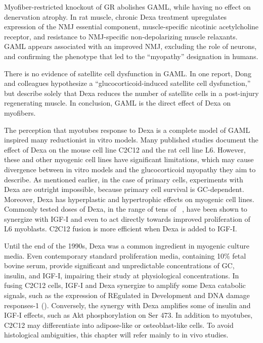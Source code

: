 \documentclass[12pt,english]{report}\usepackage[]{graphicx}\usepackage[]{color}
\begin{document}
Myofiber-restricted knockout of GR abolishes GAML, while having no
effect on denervation atrophy\citep{watson2012cell-autonomous}. In
rat muscle, chronic Dexa treatment upregulates expression of the NMJ
essential component, muscle-specific nicotinic acetylcholine receptor,
and resistance to NMJ-specific non-depolarizing muscle relaxants\citep{chen2014different}.
GAML appears associated with an improved NMJ, excluding the role of
neurons, and confirming the phenotype that led to the ``myopathy''
designation in humans.

There is no evidence of satellite cell dysfunction in GAML. In one
report, Dong and colleagues hypothesize a ``glucocorticoid-induced
satellite cell dysfunction,'' but describe solely that Dexa reduces
the number of satellite cells in a post-injury regenerating muscle\citep{dong2013myostatin}.
In conclusion, GAML is the direct effect of Dexa on myofibers. 

The perception that myotubes response to Dexa is a complete model
of GAML inspired many reductionist in vitro models. Many published
studies document the effect of Dexa on the mouse cell line C2C12 and
the rat cell line L6. However, these and other myogenic cell lines
have significant limitations, which may cause divergence between in
vitro models and the glucocorticoid myopathy they aim to describe.
As mentioned earlier, in the case of primary cells, experiments with
Dexa are outright impossible, because primary cell survival is GC-dependent.
Moreover, Dexa has hyperplastic and hypertrophic effects on myogenic
cell lines. Commonly tested doses of Dexa, in the range of tens of
\si{\nano\molar}, have been shown to synergize with IGF-I\citep{giorgino1995dexamethasone}
and even to act directly towards improved proliferation of L6 myoblasts\citep{florini1979serum-free,whitson1989dexamethasone}.
C2C12 fusion is more efficient when Dexa is added to IGF-I\citep{pansters2013synergistic}.

Until the end of the 1990s, Dexa was a common ingredient in myogenic
culture media\citep{takahashi2002myogenic}. Even contemporary standard
proliferation media, containing 10\% fetal bovine serum, provide significant
and unpredictable concentrations of GC, insulin, and IGF-I, impairing
their study at physiological concentrations. In fusing C2C12 cells,
IGF-I and Dexa synergize to amplify some Dexa catabolic signals, such
as the expression of REgulated in Development and DNA damage responses-1
()\citep{pansters2013synergistic}.
Conversely, the synergy with Dexa amplifies some of insulin and IGF-I
effects, such as Akt phosphorylation on Ser 473\citep{takahashi2002myogenic}.
In addition to myotubes, C2C12 may differentiate into adipose-like
or osteoblast-like cells. To avoid histological ambiguities, this
chapter will refer mainly to in vivo studies.
\end{document}
